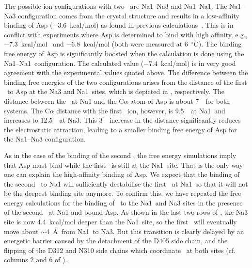 The possible ion configurations with two \Na\ are Na1--Na3 and Na1--Na1\prim. The Na1--Na3 configuration 
comes from the crystal structure and results in a low-affinity binding of Asp ($-3.6$~kcal/mol) as found 
in previous calculations~\cite{Heinzelmann2011,Heinzelmann2013}. This is in conflict with experiments 
where Asp is determined to bind with high affinity, e.g., $-7.3$~kcal/mol~\cite{Ewers2013} and 
$-6.8$~kcal/mol \cite{Hanelt2015} (both were measured at 6~$^\circ$C). The binding free energy of Asp 
is significantly boosted when the calculation is done using the Na1--Na1\prim\ configuration. The 
calculated value ($-7.4$~kcal/mol) is in very good agreement with the experimental values quoted above. 
The difference between the binding free energies of the two configurations arises from the distance of 
the first \Na\ to Asp at the Na3 and Na1\prim\ sites, which is depicted in 
, respectively. The distance between the \Na\ at Na1 and the 
C$\alpha$ atom of Asp is about 7~\angs\ for both systems. The C$\alpha$ distance with the first \Na\ ion, 
however, is 9.5~\angs\ at Na1\prim\ and increases to 12.5~\angs\ at Na3. This 3~\angs\ increase in the 
distance significantly reduces the electrostatic attraction, leading to a smaller binding free energy of 
Asp for the Na1--Na3 configuration. 

As in the case of the binding of the second \Na, the free energy simulations imply that Asp must 
bind while the first \Na\ is still at the Na1\prim\ site. That is the only way one can explain the
high-affinity binding of Asp. We expect that the binding of the second \Na\ to Na1 will sufficiently 
destabilise the first \Na\ at Na1\prim\ so that it will not be the deepest binding site anymore.
To confirm this, we have repeated the free energy calculations for the binding of \Na\ to the
Na1\prim\ and Na3 sites in the presence of the second \Na\ at Na1 and bound Asp. As shown in the 
last two rows of , the Na3 site is now 4.4~kcal/mol deeper than the Na1\prim\ site, 
so the first \Na\ will eventually move about $\sim$4~\AA\ from Na1\prim\ to Na3. But this transition is 
clearly delayed by an energetic barrier caused by the detachment of the D405 side chain, and the 
flipping of the D312 and N310 side chains which coordinate \Na\ at both sites (cf. columns 2 and 6 
of ). 

